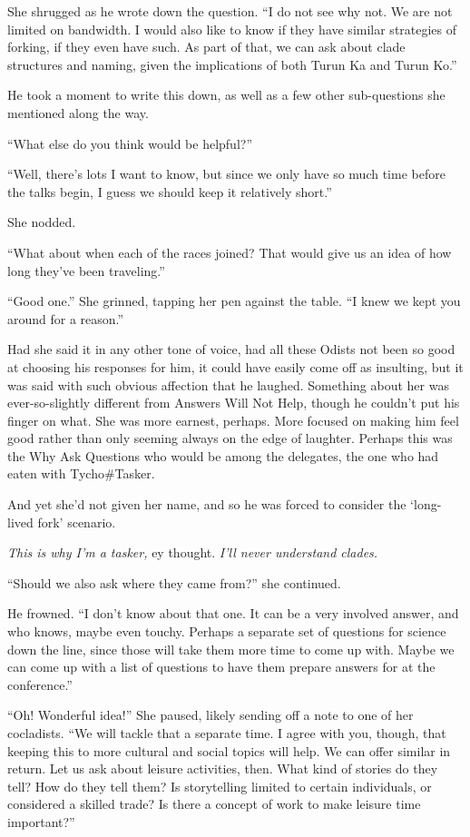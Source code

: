 She shrugged as he wrote down the question. ``I do not see why not. We are not limited on bandwidth. I would also like to know if they have similar strategies of forking, if they even have such. As part of that, we can ask about clade structures and naming, given the implications of both Turun Ka and Turun Ko.''

He took a moment to write this down, as well as a few other sub-questions she mentioned along the way.

``What else do you think would be helpful?''

``Well, there's lots I want to know, but since we only have so much time before the talks begin, I guess we should keep it relatively short.''

She nodded.

``What about when each of the races joined? That would give us an idea of how long they've been traveling.''

``Good one.'' She grinned, tapping her pen against the table. ``I knew we kept you around for a reason.''

Had she said it in any other tone of voice, had all these Odists not been so good at choosing his responses for him, it could have easily come off as insulting, but it was said with such obvious affection that he laughed. Something about her was ever-so-slightly different from Answers Will Not Help, though he couldn't put his finger on what. She was more earnest, perhaps. More focused on making him feel good rather than only seeming always on the edge of laughter. Perhaps this was the Why Ask Questions who would be among the delegates, the one who had eaten with Tycho\#Tasker.

And yet she'd not given her name, and so he was forced to consider the `long-lived fork' scenario.

\emph{This is why I'm a tasker,} ey thought. \emph{I'll never understand clades.}

``Should we also ask where they came from?'' she continued.

He frowned. ``I don't know about that one. It can be a very involved answer, and who knows, maybe even touchy. Perhaps a separate set of questions for science down the line, since those will take them more time to come up with. Maybe we can come up with a list of questions to have them prepare answers for at the conference.''

``Oh! Wonderful idea!'' She paused, likely sending off a note to one of her cocladists. ``We will tackle that a separate time. I agree with you, though, that keeping this to more cultural and social topics will help. We can offer similar in return. Let us ask about leisure activities, then. What kind of stories do they tell? How do they tell them? Is storytelling limited to certain individuals, or considered a skilled trade? Is there a concept of work to make leisure time important?''

